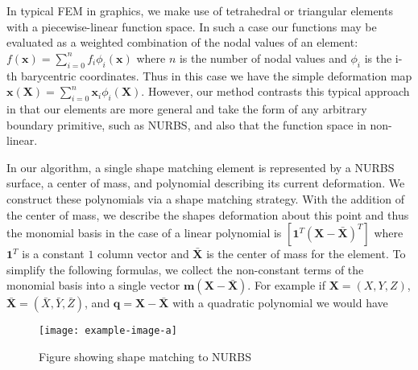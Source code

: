In typical FEM in graphics, we make use of tetrahedral or triangular elements with a piecewise-linear function space. In such a case our functions may be evaluated as a weighted combination of the nodal values of an element: $f(\mathbf x)=\sum_{i=0}^n f_i \phi_i(\mathbf{x})$ where $n$ is the number of nodal values and $\phi_i$ is the i-th barycentric coordinates. Thus in this case we have the simple deformation map $\mathbf{x(X)} = \sum_{i=0}^n \mathbf{x}_i \phi_i(\mathbf{X})$. However, our method contrasts this typical approach in that our elements are more general and take the form of any arbitrary boundary primitive, such as NURBS, and also that the function space in non-linear. 

In our algorithm, a single shape matching element is represented by a NURBS surface, a center of mass, and polynomial describing its current deformation. We construct these polynomials via a shape matching strategy. With the addition of the center of mass, we describe the shapes deformation about this point and thus the monomial basis in the case of a linear polynomial is $\left[ \mathbf 1^T (\mathbf{X - \bar{X}})^T \right]$ where $\mathbf 1^T$ is a constant $1$ column vector and $\mathbf{\bar{X}}$ is the center of mass for the element. To simplify the following formulas, we collect the non-constant terms of the monomial basis into a single vector $\mathbf{m}(\mathbf{X}-\mathbf{\bar{X}})$. For example if $\mathbf{X} = (X,Y,Z)$, $\mathbf{\bar{X}} = (\bar X, \bar Y, \bar Z)$, and $\mathbf{q}=\mathbf{X}-\mathbf{\bar{X}}$ with a quadratic polynomial we would have

\begin{figure}
    \texttt{[image: example-image-a]}
    \caption{Figure showing shape matching to NURBS}
    \label{fig:shapematching}
\end{figure}

